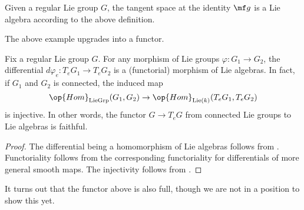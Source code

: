 \documentclass[../notes.tex]{subfiles}
\begin{document}
\begin{example}
	Given a regular Lie group $G$, the tangent space at the identity $\mf g$ is a Lie algebra according to the above definition.
\end{example}
The above example upgrades into a functor.
\begin{proposition} \label{prop:lie-group-to-lie-algebra}
	Fix a regular Lie group $G$. For any morphism of Lie groups $\varphi\colon G_1\to G_2$, the differential $d\varphi_e\colon T_eG_1\to T_eG_2$ is a (functorial) morphism of Lie algebras. In fact, if $G_1$ and $G_2$ is connected, the induced map
	\[\op{Hom}_{\mathrm{LieGrp}}(G_1,G_2)\to\op{Hom}_{\mathrm{Lie}(k)}(T_eG_1,T_eG_2)\]
	is injective. In other words, the functor $G\to T_eG$ from connected Lie groups to Lie algebras is faithful.
\end{proposition}
\begin{proof}
	The differential being a homomorphism of Lie algebras follows from . Functoriality follows from the corresponding functoriality for differentials of more general smooth maps. The injectivity follows from .
\end{proof}
\begin{remark}
	It turns out that the functor above is also full, though we are not in a position to show this yet.
\end{remark}
\end{document}
